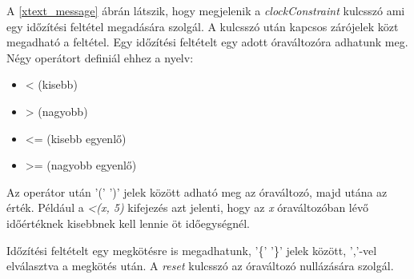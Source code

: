 A \ref{xtext_message} ábrán látszik, hogy megjelenik a \textit{clockConstraint} kulcsszó ami egy időzítési feltétel megadására szolgál.
A kulcsszó után kapcsos zárójelek közt megadható a feltétel.
Egy időzítési feltételt egy adott óraváltozóra adhatunk meg.
Négy operátort definiál ehhez a nyelv:
\begin{itemize}
    \item < (kisebb)
    \item > (nagyobb)
    \item <= (kisebb egyenlő)
    \item >= (nagyobb egyenlő)
\end{itemize}
Az operátor után ’(’ ’)’ jelek között adható meg az óraváltozó, majd utána az érték.
Például a \textit{<(x, 5)} kifejezés azt jelenti, hogy az \textit{x} óraváltozóban lévő időértéknek kisebbnek kell lennie öt időegységnél.

Időzítési feltételt egy megkötésre is megadhatunk, '\{' '\}' jelek között, ’,’-vel elválasztva a megkötés után.
A \textit{reset} kulcsszó az óraváltozó nullázására szolgál.